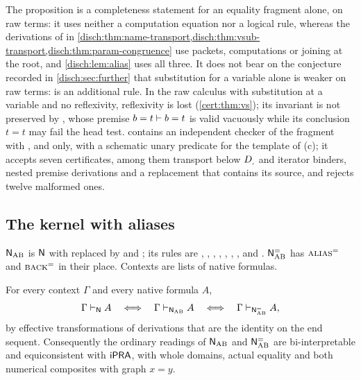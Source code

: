\begin{remark}
\label{disch:rem:alias-eq}
The proposition is a completeness statement for an equality fragment alone,
on raw terms: it uses neither a computation equation nor a logical rule,
whereas the derivations of  in
\cref{disch:thm:name-transport,disch:thm:vsub-transport,disch:thm:param-congruence}
use packets, computations or joining at the root, and
\cref{disch:lem:alias} uses all three. It does not bear on the conjecture
recorded in \cref{disch:sec:further} that substitution for a variable
alone is weaker on raw terms:  is an additional rule.
In the raw calculus with substitution at a variable and no reflexivity,
reflexivity is lost (\cref{cert:thm:vs}); its invariant is not preserved by
, whose premise $b=t\vdash b=t$ is valid vacuously while
its conclusion $t=t$ may fail the head test.  contains
an independent checker of the fragment with ,
 and  only, with a schematic unary predicate
for the template of (c); it accepts seven certificates, among them
transport below $D_{,}$ and iterator binders, nested premise derivations
and a replacement that contains its source, and rejects twelve malformed
ones.
\end{remark}

\subsection{The kernel with aliases}
\label{disch:sec:alias-kernel}

\begin{definition}
\label{disch:def:alias-kernel}
$\mathsf{N}_{\mathrm{AB}}$ is $\mathsf{N}$ with  replaced by
 and ; its rules are ,
, , , ,
, ,  and .
$\mathsf{N}^{=}_{\mathrm{AB}}$ has $\rulename{Alias}^{=}$ and
$\rulename{Back}^{=}$ in their place. Contexts are lists of native
formulas.
\end{definition}

\begin{theorem}
\label{disch:thm:alias-kernel}
For every context $\Gamma$ and every native formula $A$,
\[
 \Gamma\vdash_{\mathsf{N}}A
 \quad\Longleftrightarrow\quad
 \Gamma\vdash_{\mathsf{N}_{\mathrm{AB}}}A
 \quad\Longleftrightarrow\quad
 \Gamma\vdash_{\mathsf{N}^{=}_{\mathrm{AB}}}A,
\]
by effective transformations of derivations that are the identity on the
end sequent. Consequently the ordinary readings of $\mathsf{N}_{\mathrm{AB}}$ and
$\mathsf{N}^{=}_{\mathrm{AB}}$ are bi-interpretable and equiconsistent with
$\mathsf{iPRA}$, with whole domains, actual equality and both numerical composites
with graph $x=y$.
\end{theorem}

